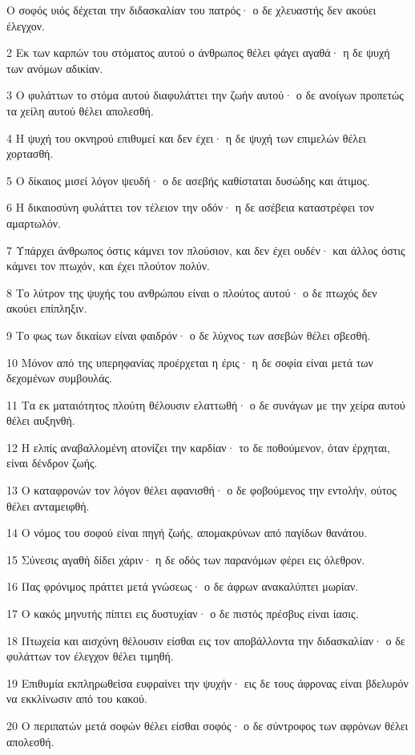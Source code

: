 \par Ο σοφός υιός δέχεται την διδασκαλίαν του πατρός· ο δε χλευαστής δεν ακούει έλεγχον.
\par 2 Εκ των καρπών του στόματος αυτού ο άνθρωπος θέλει φάγει αγαθά· η δε ψυχή των ανόμων αδικίαν.
\par 3 Ο φυλάττων το στόμα αυτού διαφυλάττει την ζωήν αυτού· ο δε ανοίγων προπετώς τα χείλη αυτού θέλει απολεσθή.
\par 4 Η ψυχή του οκνηρού επιθυμεί και δεν έχει· η δε ψυχή των επιμελών θέλει χορτασθή.
\par 5 Ο δίκαιος μισεί λόγον ψευδή· ο δε ασεβής καθίσταται δυσώδης και άτιμος.
\par 6 Η δικαιοσύνη φυλάττει τον τέλειον την οδόν· η δε ασέβεια καταστρέφει τον αμαρτωλόν.
\par 7 Υπάρχει άνθρωπος όστις κάμνει τον πλούσιον, και δεν έχει ουδέν· και άλλος όστις κάμνει τον πτωχόν, και έχει πλούτον πολύν.
\par 8 Το λύτρον της ψυχής του ανθρώπου είναι ο πλούτος αυτού· ο δε πτωχός δεν ακούει επίπληξιν.
\par 9 Το φως των δικαίων είναι φαιδρόν· ο δε λύχνος των ασεβών θέλει σβεσθή.
\par 10 Μόνον από της υπερηφανίας προέρχεται η έρις· η δε σοφία είναι μετά των δεχομένων συμβουλάς.
\par 11 Τα εκ ματαιότητος πλούτη θέλουσιν ελαττωθή· ο δε συνάγων με την χείρα αυτού θέλει αυξηνθή.
\par 12 Η ελπίς αναβαλλομένη ατονίζει την καρδίαν· το δε ποθούμενον, όταν έρχηται, είναι δένδρον ζωής.
\par 13 Ο καταφρονών τον λόγον θέλει αφανισθή· ο δε φοβούμενος την εντολήν, ούτος θέλει ανταμειφθή.
\par 14 Ο νόμος του σοφού είναι πηγή ζωής, απομακρύνων από παγίδων θανάτου.
\par 15 Σύνεσις αγαθή δίδει χάριν· η δε οδός των παρανόμων φέρει εις όλεθρον.
\par 16 Πας φρόνιμος πράττει μετά γνώσεως· ο δε άφρων ανακαλύπτει μωρίαν.
\par 17 Ο κακός μηνυτής πίπτει εις δυστυχίαν· ο δε πιστός πρέσβυς είναι ίασις.
\par 18 Πτωχεία και αισχύνη θέλουσιν είσθαι εις τον αποβάλλοντα την διδασκαλίαν· ο δε φυλάττων τον έλεγχον θέλει τιμηθή.
\par 19 Επιθυμία εκπληρωθείσα ευφραίνει την ψυχήν· εις δε τους άφρονας είναι βδελυρόν να εκκλίνωσιν από του κακού.
\par 20 Ο περιπατών μετά σοφών θέλει είσθαι σοφός· ο δε σύντροφος των αφρόνων θέλει απολεσθή.
